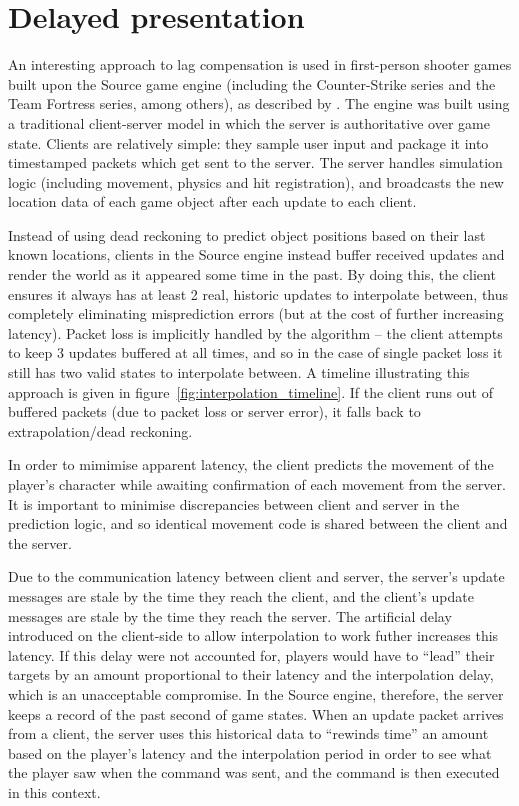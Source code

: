 \documentclass[conference]{IEEEtran}
\begin{document}
	\section{Delayed presentation}
	\label{sec:delayed_presentation}

	An interesting approach to lag compensation is used in first-person shooter games built upon the Source game engine (including the Counter-Strike series and the Team Fortress series, among others), as described by \textcite{bernier2001latency}. The engine was built using a traditional client-server model in which the server is authoritative over game state. Clients are relatively simple: they sample user input and package it into timestamped packets which get sent to the server. The server handles simulation logic (including movement, physics and hit registration), and broadcasts the new location data of each game object after each update to each client.

	Instead of using dead reckoning to predict object positions based on their last known locations, clients in the Source engine instead buffer received updates and render the world as it appeared some time in the past. By doing this, the client ensures it always has at least 2 real, historic updates to interpolate between, thus completely eliminating misprediction errors (but at the cost of further increasing latency). Packet loss is implicitly handled by the algorithm -- the client attempts to keep 3 updates buffered at all times, and so in the case of single packet loss it still has two valid states to interpolate between. A timeline illustrating this approach is given in figure~\ref{fig:interpolation_timeline}. If the client runs out of buffered packets (due to packet loss or server error), it falls back to extrapolation/dead reckoning.

	In order to mimimise apparent latency, the client predicts the movement of the player's character while awaiting confirmation of each movement from the server. It is important to minimise discrepancies between client and server in the prediction logic, and so identical movement code is shared between the client and the server.

	Due to the communication latency between client and server, the server's update messages are stale by the time they reach the client, and the client's update messages are stale by the time they reach the server. The artificial delay introduced on the client-side to allow interpolation to work futher increases this latency. If this delay were not accounted for, players would have to ``lead'' their targets by an amount proportional to their latency and the interpolation delay, which is an unacceptable compromise. In the Source engine, therefore, the server keeps a record of the past second of game states. When an update packet arrives from a client, the server uses this historical data to ``rewinds time'' an amount based on the player's latency and the interpolation period in order to see what the player saw when the command was sent, and the command is then executed in this context.
\end{document}
